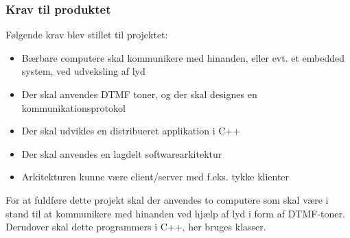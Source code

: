 \subsubsection{Krav til produktet}
Følgende krav blev stillet til projektet:
\begin{itemize}
	\item Bærbare computere skal kommunikere med hinanden, eller evt. et embedded system, ved	udveksling af lyd
	\item Der skal anvendes DTMF toner, og der skal designes en kommunikationsprotokol
	\item Der skal udvikles en distribueret applikation i C++
	\item Der skal anvendes en lagdelt softwarearkitektur
	\item Arkitekturen kunne være client/server med f.eks. tykke klienter
\end{itemize}
For at fuldføre dette projekt skal der anvendes to computere som skal være i stand til at kommunikere med hinanden ved hjælp af lyd i form af DTMF-toner. Derudover skal dette programmers i C++, her bruges klasser.